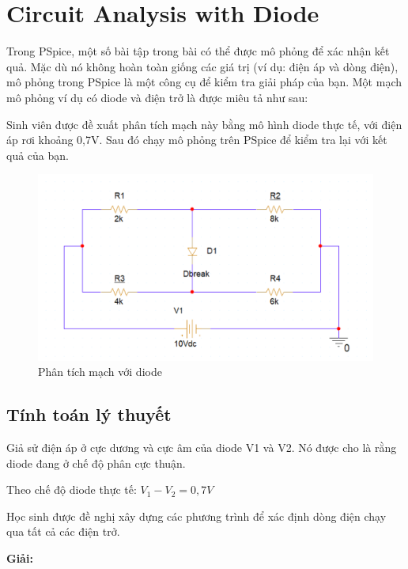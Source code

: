 \section{Circuit Analysis with Diode}
Trong PSpice, một số bài tập trong bài có thể được mô phỏng để xác nhận kết quả. Mặc dù
nó không hoàn toàn giống các giá trị (ví dụ: điện áp và dòng điện), mô phỏng trong PSpice là một
công cụ để kiểm tra giải pháp của bạn. Một mạch mô phỏng ví dụ có diode và điện trở là
được miêu tả như sau:

Sinh viên được đề xuất phân tích mạch này bằng mô hình diode thực tế, với điện áp rơi khoảng 0,7V. Sau đó chạy mô phỏng trên PSpice để kiểm tra lại với
kết quả của bạn.

\begin{figure}[h]
    \centering
    \includegraphics[scale=0.28]{graphics/ex3/f1.png}
    \caption{Phân tích mạch với diode}
\end{figure}

\subsection{Tính toán lý thuyết}
Giả sử điện áp ở cực dương và cực âm của diode V1 và V2. Nó được cho là
rằng diode đang ở chế độ phân cực thuận.

Theo chế độ diode thực tế: \(V_1 -V_2 = 0,7V\)

Học sinh được đề nghị xây dựng các phương trình để xác định dòng điện chạy qua tất cả các
điện trở.
 
\pagebreak
\textbf{Giải:}


